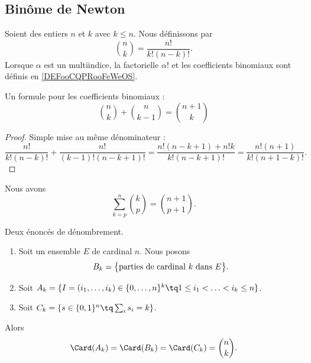 \subsection{Binôme de Newton}


\begin{definition}		\label{DEFooHXNFooOBKgqD}
	Soient des entiers \( n\) et \( k\) avec \( k\leq n\). Nous définissons  par
	\begin{equation}		\label{EQooJJYGooTvmSAt}
		{n\choose k} = \frac{ n! }{ k!(n-k)! }.
	\end{equation}
	Lorsque \( \alpha\) est un multiindice, la factorielle \( \alpha!\) et les coefficients binomiaux sont définis en \ref{DEFooCQPRooFeWeOS}.
\end{definition}

\begin{lemma}		\label{LEMooHWMNooIINsxu}
	Un formule pour les coefficients binomiaux :
	\begin{equation}
		{n\choose k}+{n\choose k-1}={n+1\choose k}
	\end{equation}
\end{lemma}

\begin{proof}
	Simple mise au même dénominateur :
	\begin{equation}
		\frac{ n! }{ k!(n-k)! }+\frac{ n! }{ (k-1)!(n-k+1)! }=\frac{ n!(n-k+1)+n!k }{ k!(n-k+1)! }=\frac{ n!(n+1) }{  k!(n+1-k)!  }.
	\end{equation}
\end{proof}

\begin{lemma}	\label{LEMooUFXEooUaFGjD}
	Nous avons
	\begin{equation}
		\sum_{k=p}^n\binom{ k }{ p }=\binom{ n+1 }{ p+1 }.
	\end{equation}
\end{lemma}


\begin{lemma}		\label{LEMooUTDTooXAmvdF}
	Deux énoncés de dénombrement.
	\begin{enumerate}
		\item
		      Soit un ensemble \( E\) de cardinal \( n\). Nous posons
		      \begin{equation}
			      B_k  =\big\{ \text{parties de cardinal \( k\) dans \( E\)} \big\}.
		      \end{equation}
		\item
		      Soit \(  A_k  =\{ I=(i_1,\ldots,i_k)\in\{ 0,\ldots,n \}^k\tq 1\leq i_1<\ldots <i_k\leq n \}\).
		\item
		      Soit \( C_k=\{ s\in\{ 0,1 \}^n\tq \sum_is_i=k \}\).
	\end{enumerate}
	Alors
	\begin{equation}
		\Card(A_k)=\Card(B_k)=\Card(C_k)={n\choose k}.
	\end{equation}
\end{lemma}

